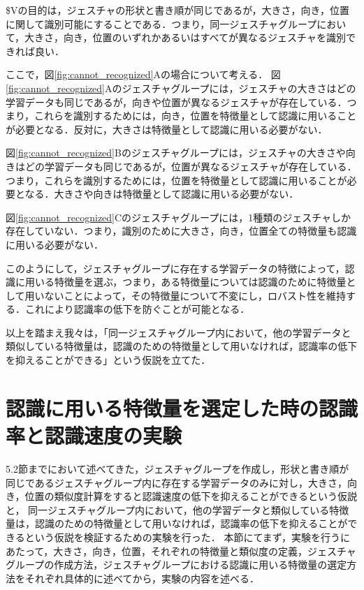 \$Vの目的は，ジェスチャの形状と書き順が同じであるが，大きさ，向き，位置に関して識別可能にすることである．つまり，同一ジェスチャグループにおいて，大きさ，向き，位置のいずれかあるいはすべてが異なるジェスチャを識別できれば良い．

ここで，図\ref{fig:cannot_recognized}Aの場合について考える．
図\ref{fig:cannot_recognized}Aのジェスチャグループには，ジェスチャの大きさはどの学習データも同じであるが，向きや位置が異なるジェスチャが存在している．つまり，これらを識別するためには，向き，位置を特徴量として認識に用いることが必要となる．反対に，大きさは特徴量として認識に用いる必要がない．

図\ref{fig:cannot_recognized}Bのジェスチャグループには，ジェスチャの大きさや向きはどの学習データも同じであるが，位置が異なるジェスチャが存在している．つまり，これらを識別するためには，位置を特徴量として認識に用いることが必要となる．大きさや向きは特徴量として認識に用いる必要がない．

図\ref{fig:cannot_recognized}Cのジェスチャグループには，1種類のジェスチャしか存在していない．つまり，識別のために大きさ，向き，位置全ての特徴量も認識に用いる必要がない．

このようにして，ジェスチャグループに存在する学習データの特徴によって，認識に用いる特徴量を選ぶ，つまり，ある特徴量については認識のために特徴量として用いないことによって，その特徴量について不変にし，ロバスト性を維持する．これにより認識率の低下を防ぐことが可能となる．

以上を踏まえ我々は，「同一ジェスチャグループ内において，他の学習データと類似している特徴量は，認識のための特徴量として用いなければ，認識率の低下を抑えることができる」という仮説を立てた．

\section{認識に用いる特徴量を選定した時の認識率と認識速度の実験}
5.2節までにおいて述べてきた，ジェスチャグループを作成し，形状と書き順が同じであるジェスチャグループ内に存在する学習データのみに対し，大きさ，向き，位置の類似度計算をすると認識速度の低下を抑えることができるという仮説と，
同一ジェスチャグループ内において，他の学習データと類似している特徴量は，認識のための特徴量として用いなければ，認識率の低下を抑えることができるという仮説を検証するための実験を行った．
本節にてまず，実験を行うにあたって，大きさ，向き，位置，それぞれの特徴量と類似度の定義，ジェスチャグループの作成方法，ジェスチャグループにおける認識に用いる特徴量の選定方法をそれぞれ具体的に述べてから，実験の内容を述べる．

